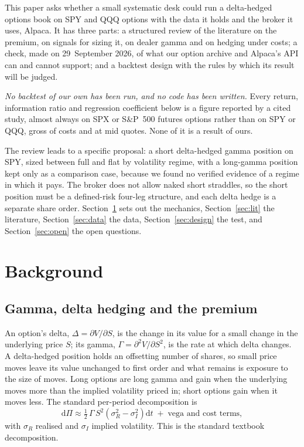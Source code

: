 \documentclass[10pt, a4paper, twocolumn]{article}
\begin{document}
This paper asks whether a small systematic desk could run a delta-hedged options book on SPY and QQQ options with the data it holds and the broker it uses, Alpaca. It has three parts: a structured review of the literature on the premium, on signals for sizing it, on dealer gamma and on hedging under costs; a check, made on 29~September 2026, of what our option archive and Alpaca's API can and cannot support; and a backtest design with the rules by which its result will be judged.

\emph{No backtest of our own has been run, and no code has been written.} Every return, information ratio and regression coefficient below is a figure reported by a cited study, almost always on SPX or S\&P~500 futures options rather than on SPY or QQQ, gross of costs and at mid quotes. None of it is a result of ours.

The review leads to a specific proposal: a short delta-hedged gamma position on SPY, sized between full and flat by volatility regime, with a long-gamma position kept only as a comparison case, because we found no verified evidence of a regime in which it pays. The broker does not allow naked short straddles, so the short position must be a defined-risk four-leg structure, and each delta hedge is a separate share order. Section~\ref{sec:background} sets out the mechanics, Section~\ref{sec:lit} the literature, Section~\ref{sec:data} the data, Section~\ref{sec:design} the test, and Section~\ref{sec:open} the open questions.

\section{Background}
\label{sec:background}

\subsection{Gamma, delta hedging and the premium}

An option's delta, $\Delta=\partial V/\partial S$, is the change in its value for a small change in the underlying price $S$; its gamma, $\Gamma=\partial^2 V/\partial S^2$, is the rate at which delta changes. A delta-hedged position holds an offsetting number of shares, so small price moves leave its value unchanged to first order and what remains is exposure to the size of moves. Long options are long gamma and gain when the underlying moves more than the implied volatility priced in; short options gain when it moves less. The standard per-period decomposition is
\begin{equation}
\mathrm{d}\Pi \approx \tfrac{1}{2}\,\Gamma\,S^{2}\left(\sigma_R^{2}-\sigma_I^{2}\right)\mathrm{d}t \;+\; \text{vega and cost terms},
\label{eq:pnl}
\end{equation}
with $\sigma_R$ realised and $\sigma_I$ implied volatility. This is the standard textbook decomposition.
\end{document}
